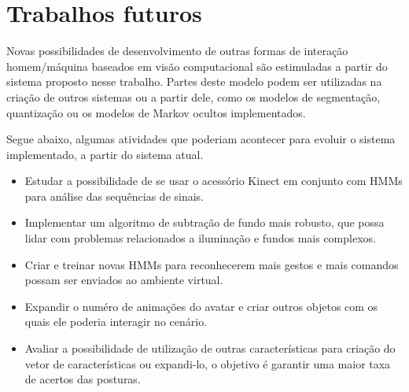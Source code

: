 \section{Trabalhos futuros}

Novas possibilidades de desenvolvimento de outras formas de interação homem/máquina baseados em visão computacional são estimuladas a partir do sistema proposto nesse trabalho. Partes deste modelo podem ser utilizadas na criação de outros sistemas ou a partir dele, como os modelos de segmentação, quantização ou os modelos de Markov ocultos implementados.

Segue abaixo, algumas atividades que poderiam acontecer para evoluir o sistema implementado, a partir do sistema atual.

\begin{itemize}

\item Estudar a possibilidade de se usar o acessório Kinect em conjunto com HMMs para análise das sequências de sinais.

\item Implementar um algoritmo de subtração de fundo mais robusto, que possa lidar com problemas relacionados a iluminação e fundos mais complexos.

\item Criar e treinar novas HMMs para reconhecerem mais gestos e mais comandos possam ser enviados ao ambiente virtual.

\item Expandir o numéro de animações do avatar e criar outros objetos com os quais ele poderia interagir no cenário.

\item Avaliar a possibilidade de utilização de outras características para criação do vetor de características ou expandi-lo, o objetivo é garantir uma maior taxa de acertos das posturas.

\end{itemize}

